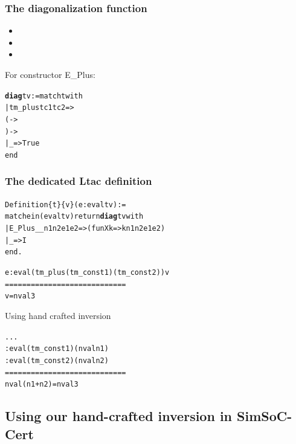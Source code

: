 \documentclass[usenames,dvipsnames]{beamer} %
\begin{document}
\begin{frame}[fragile]
\frametitle{The diagonalization function}
\begin{itemize}
\item {}
\item {}
\item {}
\end{itemize}
For constructor E\_Plus:
\begin{alltt}
\textbf{diag} t v := match t with
  | tm_plus tc1 tc2 =>
        ( -> 
                   ) ->  
  | _ => True
end
\end{alltt}
\end{frame}

\begin{frame}[fragile]
\frametitle{The dedicated Ltac definition}
\small
\begin{alltt}
Definition  \{t\} \{v\} (e: eval t v) :=
  match e in (eval t v) return \textbf{diag} t v with
    | E_Plus _ _ n1 n2 e1 e2 => (fun X k => k n1 n2 e1 e2)
    | _ => I
  end.
\end{alltt}
\medskip
\begin{alltt}
e : eval (tm_plus (tm_const 1) (tm_const 2)) v
============================
v = nval 3
\end{alltt}
Using hand crafted inversion
\begin{alltt}
...
 : eval (tm_const 1) (nval n1)
 : eval (tm_const 2) (nval n2)
============================
nval (n1 + n2) = nval 3
\end{alltt}
\end{frame}

\subsection{Using our hand-crafted inversion in SimSoC-Cert}

\end{document}
